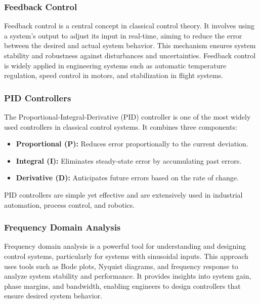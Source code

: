 \documentclass{IEEEojcsys}
\begin{document}
\subsubsection{Feedback Control}
Feedback control is a central concept in classical control theory. It involves using a system's output to adjust its input in real-time, aiming to reduce the error between the desired and actual system behavior. This mechanism ensures system stability and robustness against disturbances and uncertainties. Feedback control is widely applied in engineering systems such as automatic temperature regulation, speed control in motors, and stabilization in flight systems.

\subsubsection{PID Controllers}
The Proportional-Integral-Derivative (PID) controller is one of the most widely used controllers in classical control systems. It combines three components:
\begin{itemize}
    \item \textbf{Proportional (P):} Reduces error proportionally to the current deviation.
    \item \textbf{Integral (I):} Eliminates steady-state error by accumulating past errors.
    \item \textbf{Derivative (D):} Anticipates future errors based on the rate of change.
\end{itemize}
PID controllers are simple yet effective and are extensively used in industrial automation, process control, and robotics.

\subsubsection{Frequency Domain Analysis}
Frequency domain analysis is a powerful tool for understanding and designing control systems, particularly for systems with sinusoidal inputs. This approach uses tools such as Bode plots, Nyquist diagrams, and frequency response to analyze system stability and performance. It provides insights into system gain, phase margins, and bandwidth, enabling engineers to design controllers that ensure desired system behavior.
\end{document}
